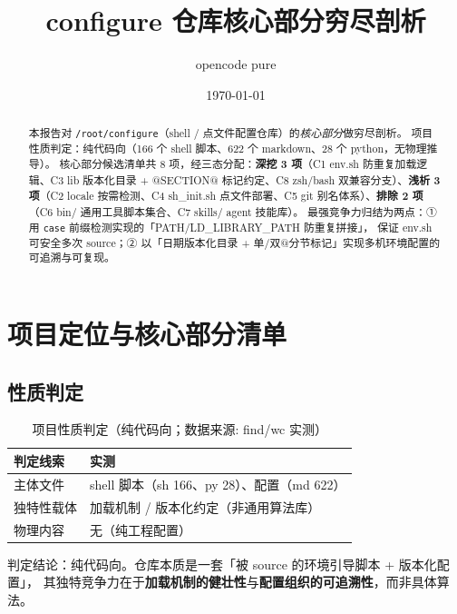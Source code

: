 \documentclass[UTF8]{ctexart}
\title{configure 仓库核心部分穷尽剖析}
\author{opencode pure}
\date{\today}
\begin{document}
\maketitle

\begin{abstract}
本报告对 \texttt{/root/configure}（shell / 点文件配置仓库）的\emph{核心部分}做穷尽剖析。
项目性质判定：\textcolor{algo}{纯代码向}（166 个 shell 脚本、622 个 markdown、28 个 python，无物理推导）。
核心部分候选清单共 8 项，经三态分配：\textbf{深挖 3 项}（C1 env.sh 防重复加载逻辑、C3 lib 版本化目录
+ @SECTION@ 标记约定、C8 zsh/bash 双兼容分支）、\textbf{浅析 3 项}（C2 locale 按需检测、C4 sh\_init.sh
点文件部署、C5 git 别名体系）、\textbf{排除 2 项}（C6 bin/ 通用工具脚本集合、C7 skills/ agent 技能库）。
最强竞争力归结为两点：① 用 \texttt{case} 前缀检测实现的「PATH/LD\_LIBRARY\_PATH 防重复拼接」，
保证 env.sh 可安全多次 source；② 以「日期版本化目录 + 单/双@分节标记」实现多机环境配置的可追溯与可复现。
\end{abstract}

\tableofcontents

\section{项目定位与核心部分清单}
\subsection{性质判定}
\begin{table}[htbp]\centering
\begin{tabular}{ll}
\toprule
判定线索 & 实测 \\
\midrule
主体文件 & shell 脚本（sh 166、py 28）、配置（md 622） \\
独特性载体 & 加载机制 / 版本化约定（非通用算法库） \\
物理内容 & 无（纯工程配置） \\
\bottomrule
\end{tabular}
\caption{项目性质判定（纯代码向；数据来源: find/wc 实测）}
\end{table}
\textcolor{algo}{判定结论}：纯代码向。仓库本质是一套「被 source 的环境引导脚本 + 版本化配置」，
其独特竞争力在于\textbf{加载机制的健壮性}与\textbf{配置组织的可追溯性}，而非具体算法。
\end{document}
